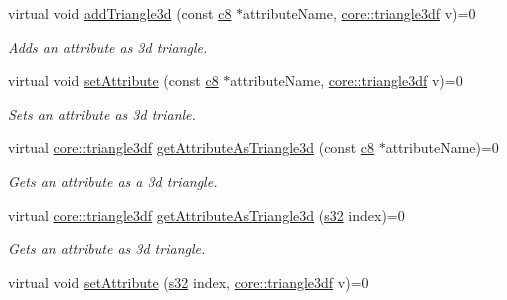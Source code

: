 \begin{DoxyCompactItemize}
virtual void \hyperlink{classirr_1_1io_1_1IAttributes_a0f27f971247a14b10945bade9534b045}{add\+Triangle3d} (const \hyperlink{namespaceirr_a9395eaea339bcb546b319e9c96bf7410}{c8} $\ast$attribute\+Name, \hyperlink{namespaceirr_1_1core_a1112835405bbec5dadf031dc7934e7d0}{core\+::triangle3df} v)=0
\begin{DoxyCompactList}\small\item\em Adds an attribute as 3d triangle. \end{DoxyCompactList}\item 
\mbox{\label{classirr_1_1io_1_1IAttributes_ad86e88d9eb7c7af519fedd04d9328ea6}} 
virtual void \hyperlink{classirr_1_1io_1_1IAttributes_ad86e88d9eb7c7af519fedd04d9328ea6}{set\+Attribute} (const \hyperlink{namespaceirr_a9395eaea339bcb546b319e9c96bf7410}{c8} $\ast$attribute\+Name, \hyperlink{namespaceirr_1_1core_a1112835405bbec5dadf031dc7934e7d0}{core\+::triangle3df} v)=0
\begin{DoxyCompactList}\small\item\em Sets an attribute as 3d trianle. \end{DoxyCompactList}\item 
virtual \hyperlink{namespaceirr_1_1core_a1112835405bbec5dadf031dc7934e7d0}{core\+::triangle3df} \hyperlink{classirr_1_1io_1_1IAttributes_a11b477925de4a257400cc7c920ec5e40}{get\+Attribute\+As\+Triangle3d} (const \hyperlink{namespaceirr_a9395eaea339bcb546b319e9c96bf7410}{c8} $\ast$attribute\+Name)=0
\begin{DoxyCompactList}\small\item\em Gets an attribute as a 3d triangle. \end{DoxyCompactList}\item 
virtual \hyperlink{namespaceirr_1_1core_a1112835405bbec5dadf031dc7934e7d0}{core\+::triangle3df} \hyperlink{classirr_1_1io_1_1IAttributes_a75ff98c5c43f887dcaa2f1c8439d791d}{get\+Attribute\+As\+Triangle3d} (\hyperlink{namespaceirr_ac66849b7a6ed16e30ebede579f9b47c6}{s32} index)=0
\begin{DoxyCompactList}\small\item\em Gets an attribute as 3d triangle. \end{DoxyCompactList}\item 
\mbox{\label{classirr_1_1io_1_1IAttributes_ab5aaaa5b8979eef09b005613264dd8af}} 
virtual void \hyperlink{classirr_1_1io_1_1IAttributes_ab5aaaa5b8979eef09b005613264dd8af}{set\+Attribute} (\hyperlink{namespaceirr_ac66849b7a6ed16e30ebede579f9b47c6}{s32} index, \hyperlink{namespaceirr_1_1core_a1112835405bbec5dadf031dc7934e7d0}{core\+::triangle3df} v)=0

\end{DoxyCompactItemize}
